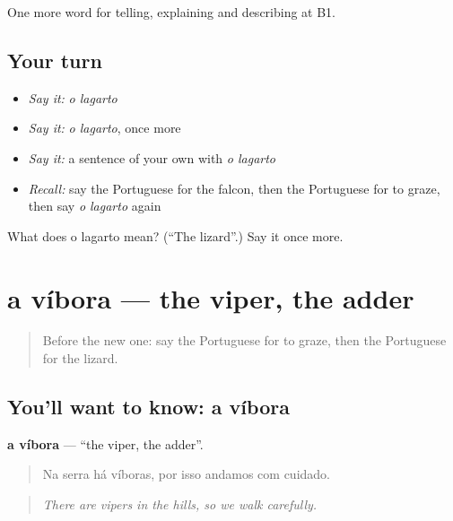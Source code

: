 \begin{grammarlens}[title={What you've built}]
One more word for telling, explaining and describing at B1.
\end{grammarlens}

\subsection*{Your turn}
\begin{itemize}
\raggedright
  \item \emph{Say it:} \emph{o lagarto}
  \item \emph{Say it:} \emph{o lagarto}, once more
  \item \emph{Say it:} a sentence of your own with \emph{o lagarto}
  \item \emph{Recall:} say the Portuguese for the falcon, then the Portuguese for to graze, then say \emph{o lagarto} again
\end{itemize}

\begin{tcolorbox}[breakable,colback=teal!4,colframe=teal!35!black,title={Before you move on}]
What does o lagarto mean? (\textquotedblleft{}The lizard\textquotedblright{}.) Say it once more.
\end{tcolorbox}
\section[a víbora]{a víbora — the viper, the adder}

\label{lesson:PT-C461-vibora}



\begin{quote}
Before the new one: say the Portuguese for to graze, then the Portuguese for the lizard.
\end{quote}

\subsection*{You'll want to know: a víbora}
\textbf{a víbora} — \textquotedblleft{}the viper, the adder\textquotedblright{}.

\begin{quote}
Na serra há víboras, por isso andamos com cuidado.
\end{quote}

\begin{quote}
\emph{There are vipers in the hills, so we walk carefully.}
\end{quote}

